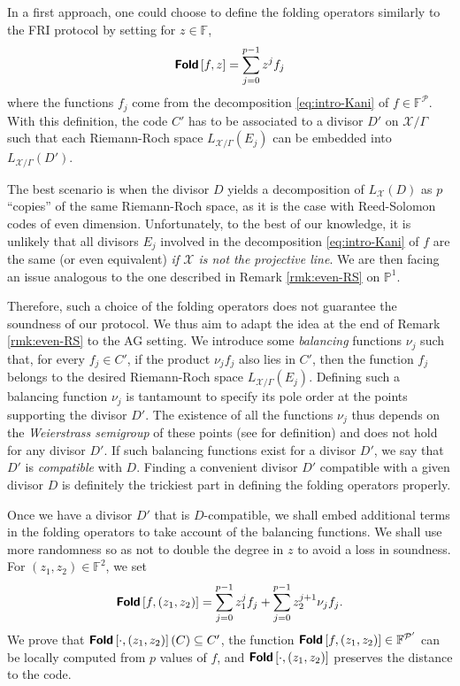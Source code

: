 \documentclass[10pt,a4paper]{article}
\newcommand\F{\mathbb{F}}
\newcommand\PP{\mathbb{P}}
\newcommand\fold[1]{\textsf{\textbf{Fold}}\left[#1\right]}
\newcommand\calX{\mathcal{X}}
\newcommand\calP{\mathcal{P}}
\theoremstyle{plain}
\theoremstyle{plain}
\theoremstyle{definition}
\theoremstyle{remark}
\theoremstyle{plain}
\begin{document}
\medskip

In a first approach, one could choose to define the folding operators similarly to the \textsf{FRI} protocol by setting for $z \in \F$, \[\fold{f,z}=\sum_{j=0}^{p-1} z^j f_j\] where the functions $f_j$ come from the decomposition \eqref{eq:intro-Kani} of $f \in \F^\calP$. With this definition, the code $C'$ has to be associated to a divisor $D'$ on $\calX/\Gamma$ such that each Riemann-Roch space $L_{\calX / \Gamma}(E_j)$ can be embedded into $L_{\calX / \Gamma}(D')$.

The best scenario is when the divisor $D$ yields a decomposition of $L_\calX(D)$ as $p$ ``copies'' of the same Riemann-Roch space, as it is the case with Reed-Solomon codes of even dimension.  Unfortunately, to the best of our knowledge, it is unlikely that all divisors $E_j$ involved in the decomposition \eqref{eq:intro-Kani} of $f$ are the same (or even equivalent) \emph{if $\calX$ is not the projective line}. We are then facing an issue analogous to the one described in Remark \ref{rmk:even-RS} on $\PP^1$.

Therefore, such a choice of the folding operators does not guarantee the soundness of our protocol.     We thus aim to adapt the idea at the end of Remark \ref{rmk:even-RS} to the AG setting. We introduce some \emph{balancing} functions $\nu_j$ such that, for every $f_j \in C'$, if the product $\nu_j f_j$ also lies in $C'$, then the function $f_j$ belongs to the desired Riemann-Roch space $L_{\calX / \Gamma}(E_j)$. Defining such a balancing function $\nu_j$ is tantamount to specify its pole order at the points supporting the divisor $D'$. The existence of all the functions $\nu_j$ thus depends on the \emph{Weierstrass semigroup} of these points (see \cite[Section 6.6]{HKT13} for definition) and does not hold for any divisor $D'$. If such balancing functions exist for a divisor $D'$, we say that $D'$ is \emph{compatible} with $D$. Finding a convenient divisor $D'$ compatible with a given divisor $D$ is definitely the trickiest part in defining the folding operators properly.

Once we have a divisor $D'$ that is $D$-compatible, we shall embed additional terms in the folding operators to take account of the balancing functions. We shall use more randomness so as not to double the degree in $z$ to avoid a loss in soundness. For $(z_1,z_2) \in \F^2$, we set
\[\fold{f,(z_1,z_2)}=\sum_{j=0}^{p-1} z_1^j f_j+\sum_{j=0}^{p-1} z_2^{j+1} \nu_j f_j.\]
We prove that $\fold{\cdot,(z_1,z_2)}(C) \subseteq C'$, the function $\fold{f,(z_1,z_2)} \in \F^{\calP'}$ can be locally computed from $p$ values of $f$, and $\fold{\cdot,(z_1,z_2)}$ preserves the distance to the code.
\end{document}
